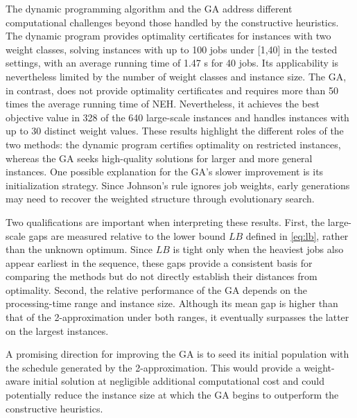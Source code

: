 ﻿\documentclass[12pt]{article}
\begin{document}
\begin{sloppypar}
The dynamic programming algorithm and the GA address different computational challenges beyond those handled 
by the constructive heuristics. 
The dynamic program provides optimality certificates for instances with two weight classes, 
solving instances with up to 100 jobs under [1,40] in the tested settings, 
with an average running time of 1.47 s for 40 jobs. 
Its applicability is nevertheless limited by the number of weight classes and instance size. 
The GA, in contrast, does not provide optimality certificates and requires more than 50 times 
the average running time of NEH. Nevertheless, 
it achieves the best objective value in 328 of the 640 large-scale instances and handles instances 
with up to 30 distinct weight values. These results highlight the different roles of the two methods: 
the dynamic program certifies optimality on restricted instances, 
whereas the GA seeks high-quality solutions for larger and more general instances. 
One possible explanation for the GA's slower improvement is its initialization strategy. 
Since Johnson's rule ignores job weights, 
early generations may need to recover the weighted structure through evolutionary search.

Two qualifications are important when interpreting these results. 
First, the large-scale gaps are measured relative to the lower bound \(LB\) defined in \cref{eq:lb}, 
rather than the unknown optimum. 
Since \(LB\) is tight only when the heaviest jobs also appear earliest in the sequence, 
these gaps provide a consistent basis for comparing the methods but do not directly establish their distances from optimality. 
Second, the relative performance of the GA depends on the processing-time range and instance size. 
Although its mean gap is higher than that of the 2-approximation under both ranges, 
it eventually surpasses the latter on the largest instances.

A promising direction for improving the GA is to seed its initial population with the schedule 
generated by the 2-approximation. 
This would provide a weight-aware initial solution at negligible additional computational cost 
and could potentially reduce the instance size at which the GA begins to outperform the constructive heuristics.


\end{sloppypar}
\end{document}
